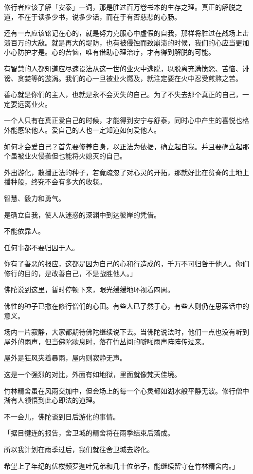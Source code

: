 \documentclass[twoside,openany]{book}
\begin{document}
修行者应该了解「安泰」一词，那是胜过百万卷书本的生存之理。真正的解脱之道，不在于读多少书，说多少话，而在于有否慈悲的心肠。

还有一点应该铭记在心的，就是努力克服心中虚假的自我，那样将胜过在战场上击溃百万的大敌。就是再大的堤防，也有被侵蚀而致崩溃的时候，我们的心应当更加小心防护才是。心的苦恼，唯有借助心理治疗，才有得到解脱的可能。

有智慧的人都知道应尽速设法从这一世的业火中逃脱，以脱离充满愤怨、苦恼、诽谤、贪婪等的漩涡。我们的心一旦被业火燃及，就注定要在火中忍受煎熬之苦。

善心就是你们的主人，也就是永不会灭失的自己。为了不失去那个真正的自己，一定要远离业火。

一个人只有在真正爱自己的时候，才能得到安宁与舒泰，同时心中产生的喜悦也格外能感染他人。爱自己的人也一定知道如何爱他人。

如何才会爱自己？首先要修养自身，以正法为依据，确立起自我。并且要确立起那个虽被业火侵袭但也能将火媳灭的自己。

外出游化，散播正法的种子，若竟疏忽了对心灵的开拓，那就好比在贫脊的土地上播种般，终究不会有多大的收获。

智慧、毅力和勇气。

是确立自我，使人从迷惑的深渊中到达彼岸的凭借。

不能依靠人。

任何事都不要归因于人。

你有了善恶的报应，这都是因为自己的心和行造成的，千万不可归咎于他人。你们修行的目的，是改善自己，不是战胜他人。」

佛陀说到这里，暂时停顿下来，眼光缓缓地环视着四周。

佛性的种子已撒在修行僧们的心田。有些人已了然于心，有些人则仍在思索话中的意义。

场内一片寂静，大家都期待佛陀继续说下去。当佛陀说法时，他们一点也没有听到屋外的雨声，但当佛陀歇息时，落在竹丛间的噼啪雨声阵阵传过来。

屋外是狂风夹着暴雨，屋内则寂静无声。

这是一个强烈的对比，外面有如地狱，里面就像梵天佳境。

竹林精舍虽在风雨交加中，但会场上的每一个心灵都如湖水般平静无波。修行僧中渐有人领悟到此心即法的道理。

不一会儿，佛陀谈到日后游化的事情。

「据目犍连的报告，舍卫城的精舍将在雨季结束后落成。

所以我计划在雨季过后，我们就往舍卫城去游化。

希望上了年纪的优楼频罗迦叶兄弟和几十位弟子，能继续留守在竹林精舍内。」
\end{document}
